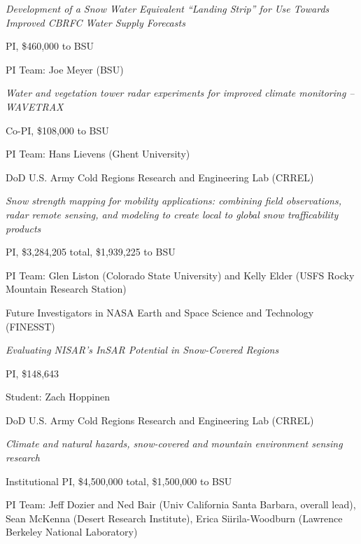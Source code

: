 \documentclass[11pt]{article}
\renewenvironment{itemize}{
  \begin{list}{}{
    \setlength{\leftmargin}{1.5em}
    \setlength{\itemsep}{0pt}
    \setlength{\parskip}{0pt}
  }
}{
  \end{list}
}
\begin{document}
\begin{itemize}
\item[2/2024-2/2027] 
\begin{itemize}
\item \textit{Development of a Snow Water Equivalent “Landing Strip” for Use Towards Improved CBRFC Water Supply Forecasts}
\item PI, \$460,000 to BSU
\item PI Team: Joe Meyer (BSU)
\end{itemize}

\item[9/2024-9/2029] 
\begin{itemize}
\item \textit{Water and vegetation tower radar experiments for improved climate monitoring – WAVETRAX}
\item Co-PI, \$108,000 to BSU
\item PI Team: Hans Lievens (Ghent University)
\end{itemize}

\item[7/2024-7/2027] DoD U.S. Army Cold Regions Research and Engineering Lab (CRREL)
\begin{itemize}
\item \textit{Snow strength mapping for mobility applications: combining field observations, radar remote sensing, and modeling to create local to global snow trafficability products}
\item PI, \$3,284,205 total, \$1,939,225 to BSU
\item PI Team: Glen Liston (Colorado State University) and Kelly Elder (USFS Rocky Mountain Research Station)
\end{itemize}

\item[9/2023-8/2026] Future Investigators in NASA Earth and Space Science and Technology (FINESST)
\begin{itemize}
\item \textit{Evaluating NISAR’s InSAR Potential in Snow-Covered Regions}
\item PI, \$148,643 
\item Student: Zach Hoppinen
\end{itemize}

\item[9/2023-8/2025] DoD U.S. Army Cold Regions Research and Engineering Lab (CRREL)
\begin{itemize}
\item \textit{Climate and natural hazards, snow-covered and mountain environment sensing research}
\item Institutional PI, \$4,500,000 total, \$1,500,000 to BSU 
\item PI Team: Jeff Dozier and Ned Bair (Univ California Santa Barbara, overall lead), Sean McKenna (Desert Research Institute), Erica Siirila-Woodburn (Lawrence Berkeley National Laboratory)
\end{itemize}


\end{itemize}
\end{document}

